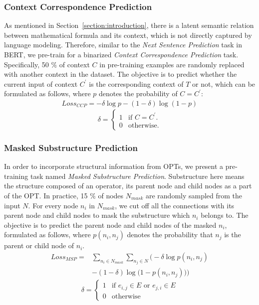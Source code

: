 \documentclass{article}
\begin{document}
\subsubsection{Context Correspondence Prediction}

As mentioned in Section~\ref{section:introduction}, there is a latent semantic relation between mathematical formula and its context, which is not directly captured by language modeling. Therefore, similar to the \textit{Next Sentence Prediction} task in BERT, we pre-train for a binarized \textit{Context Correspondence Prediction} task. Specifically, 50 $\%$ of context $C$ in pre-training examples are randomly replaced with another context in the dataset. The objective is to predict whether the current input of context $C^{\prime}$ is the corresponding context of $T$ or not, which can be formulated as follows, where $p$ denotes the probability of $C=C^{\prime}$:
\begin{align}
    Loss_{CCP} = -\delta \log p - (1-\delta) \log (1-p)
\end{align}
\vskip -0.15in
\begin{equation}
    \delta=\begin{cases}
        1 & \text{if $C = C^{\prime}$}. \\
        0 & \text{otherwise}.
    \end{cases}
\end{equation}

\subsubsection{Masked Substructure Prediction}

In order to incorporate structural information from OPTs, we present a pre-training task named \textit{Masked Substructure Prediction}. Substructure here means the structure composed of an operator, its parent node and child nodes as a part of the OPT. In practice, 15 $\%$ of nodes $N_{mask}$ are randomly sampled from the input $N$. For every node $n_i$ in $N_{mask}$, we cut off all the connections with its parent node and child nodes to mask the substructure which $n_i$ belongs to. The objective is to predict the parent node and child nodes of the masked $n_i$, formulated as follows, where $p(n_i,n_j)$ denotes the probability that $n_j$ is the parent or child node of $n_i$.
\begin{align}
   Loss_{MSP} = & \sum_{n_i \in N_{mask}} \sum_{n_j \in N} \bigg( -\delta \log p(n_i,n_j) \nonumber\\ & - (1-\delta) \log \big(1-p(n_i,n_j)\big) \bigg)
\end{align}
\vskip -0.1in
\begin{equation}
    \delta=\begin{cases}
        1 & \text{if $e_{i,j} \in E$ or $e_{j,i} \in E$} \\
        0 & \text{otherwise}
    \end{cases}
\end{equation}
\end{document}
